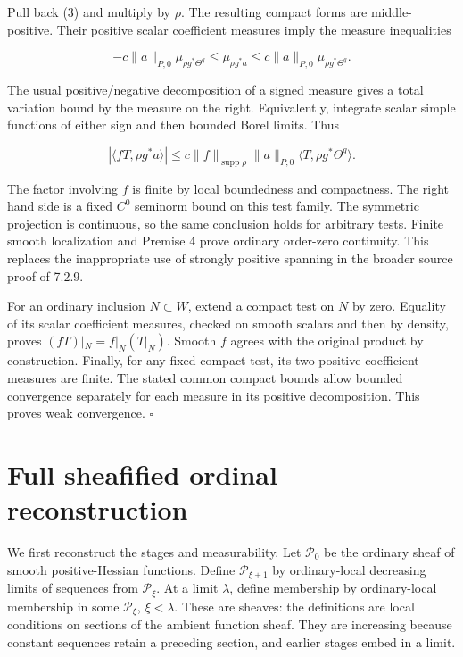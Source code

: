 \documentclass[
  11pt,
]{article}
\begin{document}
Pull back (3) and multiply by \(\rho\). The resulting compact forms are
middle-positive. Their positive scalar coefficient measures imply the
measure inequalities

\[-c\|a\|_{P,0}\mu_{\rho g^*\Theta^q}
  \leq\mu_{\rho g^*a}
  \leq c\|a\|_{P,0}\mu_{\rho g^*\Theta^q}.\]

The usual positive/negative decomposition of a signed measure gives a
total variation bound by the measure on the right. Equivalently,
integrate scalar simple functions of either sign and then bounded Borel
limits. Thus

\[ |\langle fT,\rho g^*a\rangle|
 \leq c\|f\|_{\operatorname{supp}\rho}\|a\|_{P,0}
       \langle T,\rho g^*\Theta^q\rangle. \tag{4}\]

The factor involving \(f\) is finite by local boundedness and
compactness. The right hand side is a fixed \(C^0\) seminorm bound on
this test family. The symmetric projection is continuous, so the same
conclusion holds for arbitrary tests. Finite smooth localization and
Premise 4 prove ordinary order-zero continuity. This replaces the
inappropriate use of strongly positive spanning in the broader source
proof of 7.2.9.

For an ordinary inclusion \(N\subset W\), extend a compact test on \(N\)
by zero. Equality of its scalar coefficient measures, checked on smooth
scalars and then by density, proves \((fT)|_N=f|_N(T|_N)\). Smooth \(f\)
agrees with the original product by construction. Finally, for any fixed
compact test, its two positive coefficient measures are finite. The
stated common compact bounds allow bounded convergence separately for
each measure in its positive decomposition. This proves weak
convergence. \(\square\)

\section{Full sheafified ordinal
reconstruction}\label{full-sheafified-ordinal-reconstruction}

We first reconstruct the stages and measurability. Let \(\mathcal P_0\)
be the ordinary sheaf of smooth positive-Hessian functions. Define
\(\mathcal P_{\xi+1}\) by ordinary-local decreasing limits of sequences
from \(\mathcal P_\xi\). At a limit \(\lambda\), define membership by
ordinary-local membership in some \(\mathcal P_\xi\), \(\xi<\lambda\).
These are sheaves: the definitions are local conditions on sections of
the ambient function sheaf. They are increasing because constant
sequences retain a preceding section, and earlier stages embed in a
limit.
\end{document}
